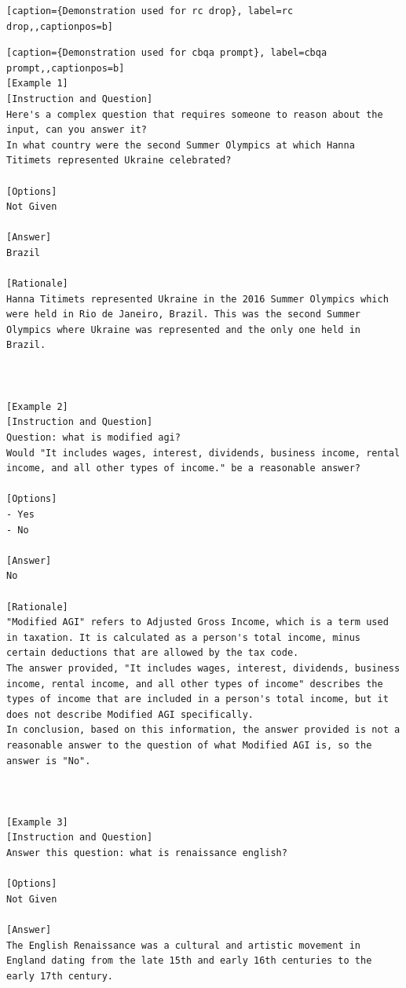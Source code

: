 \begin{lstlisting}[caption={Demonstration used for rc drop}, label=rc drop,,captionpos=b]

    \end{lstlisting}
    




\begin{lstlisting}[caption={Demonstration used for cbqa prompt}, label=cbqa prompt,,captionpos=b]
[Example 1]
[Instruction and Question]
Here's a complex question that requires someone to reason about the input, can you answer it?
In what country were the second Summer Olympics at which Hanna Titimets represented Ukraine celebrated?

[Options]
Not Given

[Answer]
Brazil

[Rationale]
Hanna Titimets represented Ukraine in the 2016 Summer Olympics which were held in Rio de Janeiro, Brazil. This was the second Summer Olympics where Ukraine was represented and the only one held in Brazil.



[Example 2]
[Instruction and Question]
Question: what is modified agi?
Would "It includes wages, interest, dividends, business income, rental income, and all other types of income." be a reasonable answer?

[Options]
- Yes
- No

[Answer]
No

[Rationale]
"Modified AGI" refers to Adjusted Gross Income, which is a term used in taxation. It is calculated as a person's total income, minus certain deductions that are allowed by the tax code. 
The answer provided, "It includes wages, interest, dividends, business income, rental income, and all other types of income" describes the types of income that are included in a person's total income, but it does not describe Modified AGI specifically. 
In conclusion, based on this information, the answer provided is not a reasonable answer to the question of what Modified AGI is, so the answer is "No".



[Example 3]
[Instruction and Question]
Answer this question: what is renaissance english?

[Options]
Not Given

[Answer]
The English Renaissance was a cultural and artistic movement in England dating from the late 15th and early 16th centuries to the early 17th century.


\end{lstlisting}
